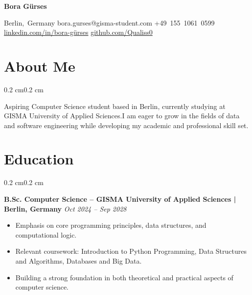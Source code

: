 \documentclass[10pt, letterpaper]{article}
\newenvironment{highlights}{
    \begin{itemize}[topsep=0.10 cm, parsep=0.10 cm, partopsep=0pt, itemsep=0pt, leftmargin=0.6 cm]
}{
    \end{itemize}
}
\newenvironment{onecolentry}{
    \begin{adjustwidth}{0.2 cm}{0.2 cm}
}{
    \end{adjustwidth}
}
\newenvironment{header}{
    \setlength{\topsep}{0pt}\par\kern\topsep\centering\color{primaryColor}\linespread{1.5}
}{
    \par\kern\topsep
}
\newcommand{\placelastupdatedtext}{
  \AddToShipoutPictureFG*{
    \put(
        \LenToUnit{\paperwidth-2 cm-0.2 cm+0.05cm},
        \LenToUnit{\paperheight-1.0 cm}
    ){\vtop{{\null}\makebox[0pt][c]{
        \small\color{gray}\textit{Last updated May 2025}
    }}}%
  }%
}
\begin{document}
\placelastupdatedtext

\begin{header}
    \fontsize{30 pt}{30 pt}
    \textbf{Bora Gürses}

    \vspace{0.3 cm}

    \normalsize
    \mbox{{\footnotesize\faMapMarker*}\hspace*{0.13cm}Berlin, Germany}%
    \hspace{0.4cm}
    \mbox{{\footnotesize\faEnvelope[regular]}\hspace*{0.13cm}bora.gurses@gisma-student.com}%
    \hspace{0.4cm}
    \mbox{{\footnotesize\faPhone*}\hspace*{0.13cm}+49 155 1061 0599}%
    \hspace{0.4cm}
    \mbox{{\footnotesize\faLinkedinIn}\hspace*{0.13cm}\href{https://linkedin.com/in/bora-gürses-29b0232ba}{linkedin.com/in/bora-gürses}}%
    \hspace{0.4cm}
    \mbox{{\footnotesize\faGithub}\hspace*{0.13cm}\href{https://github.com/Qualiss0}{github.com/Qualiss0}}%
\end{header}

\vspace{0.3 cm}

\section{About Me}
\begin{onecolentry}
Aspiring Computer Science student based in Berlin, currently studying at GISMA University of Applied Sciences.I am eager to grow in the fields of data and software engineering while developing my academic and professional skill set.
\end{onecolentry}


\section{Education}
\begin{onecolentry}
\textbf{B.Sc. Computer Science – GISMA University of Applied Sciences  |  Berlin, Germany} \hfill \textit{Oct 2024 – Sep 2028}
\end{onecolentry}
\begin{highlights}
\item Emphasis on core programming principles, data structures, and computational logic.
\item Relevant coursework: Introduction to Python Programming, Data Structures and Algorithms, Databases and Big Data.
\item Building a strong foundation in both theoretical and practical aspects of computer science.
\end{highlights}
\end{document}
